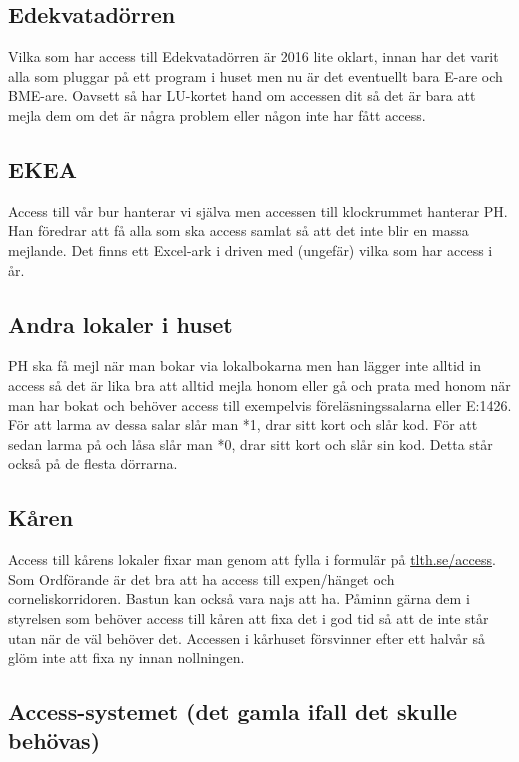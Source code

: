 \documentclass[10pt]{article}
\begin{document}
\subsection{Edekvatadörren}

Vilka som har access till Edekvatadörren är 2016 lite oklart, innan har det varit alla som pluggar på ett program i huset men nu är det eventuellt bara E-are och BME-are. Oavsett så har LU-kortet hand om accessen dit så det är bara att mejla dem om det är några problem eller någon inte har fått access.

\subsection{EKEA}

Access till vår bur hanterar vi själva men accessen till klockrummet hanterar PH. Han föredrar att få alla som ska access samlat så att det inte blir en massa mejlande. Det finns ett Excel-ark i driven med (ungefär) vilka som har access i år.

\subsection{Andra lokaler i huset}

PH ska få mejl när man bokar via lokalbokarna men han lägger inte alltid in access så det är lika bra att alltid mejla honom eller gå och prata med honom när man har bokat och behöver access till exempelvis föreläsningssalarna eller E:1426. För att larma av dessa salar slår man *1, drar sitt kort och slår kod. För att sedan larma på och låsa slår man *0, drar sitt kort och slår sin kod. Detta står också på de flesta dörrarna.

\subsection{Kåren}

Access till kårens lokaler fixar man genom att fylla i formulär på \url{tlth.se/access}. Som Ordförande är det bra att ha access till expen/hänget och corneliskorridoren. Bastun kan också vara najs att ha. Påminn gärna dem i styrelsen som behöver access till kåren att fixa det i god tid så att de inte står utan när de väl behöver det. Accessen i kårhuset försvinner efter ett halvår så glöm inte att fixa ny innan nollningen.

\subsection{Access-systemet (det gamla ifall det skulle behövas)}
\end{document}
